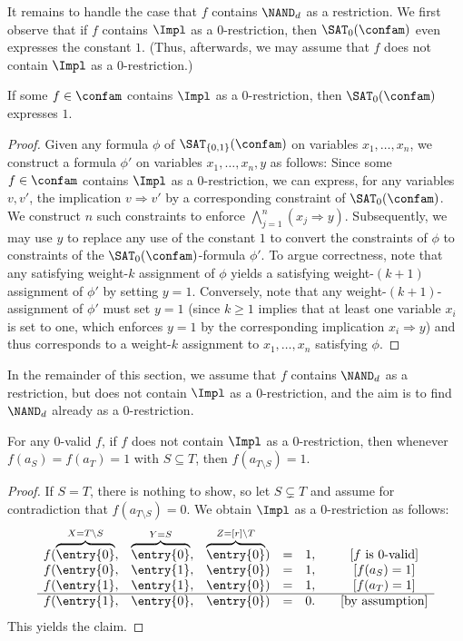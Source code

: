 %
%
It remains to handle the case that $f$ contains $\NAND_d$ as a restriction.
We first observe that if $f$ contains $\Impl$ as a $0$-restriction, then $\SAT_0(\confam)$ even expresses the constant $1$. (Thus, afterwards, we may assume that $f$ does not contain $\Impl$ as a 0-restriction.)
%
\begin{lem}\label{lem:0validexpresses1}
If some $f\in \confam$ contains $\Impl$ as a $0$-restriction, then $\SAT_0(\confam)$ expresses $1$. 
\end{lem}
\begin{proof}
Given any formula $\phi$ of $\SAT_{\{0,1\}}(\confam)$ on variables $x_1,\dots,x_n$, we construct a formula $\phi'$ on variables $x_1,\dots, x_n, y$ as follows: Since some $f\in \confam$ contains $\Impl$ as a $0$-restriction, we can express, for any variables $v,v'$, the implication $v \Rightarrow v'$ by a corresponding constraint of $\SAT_0(\confam)$. We construct $n$ such constraints to enforce $\bigwedge_{j=1}^{n} (x_j\Rightarrow  y)$. Subsequently, we may use $y$ to replace any use of the constant $1$ to convert the constraints of $\phi$ to constraints of the $\SAT_{0}(\confam)$-formula $\phi'$. 
%
To argue correctness, note that any satisfying weight-$k$ assignment of $\phi$ yields a satisfying weight-$(k+1)$ assignment of $\phi'$ by setting $y=1$. Conversely, note that any weight-$(k+1)$-assignment of $\phi'$ must set $y=1$ (since $k\ge 1$ implies that at least one variable $x_i$ is set to one, which enforces $y=1$ by the corresponding implication $x_i \Rightarrow y$) and thus corresponds to a weight-$k$ assignment to $x_1,\dots, x_n$ satisfying $\phi$. 
\end{proof}
%
%
%
%
%
In the remainder of this section, we assume that $f$ contains $\NAND_d$ as a restriction, but does not contain $\Impl$ as a $0$-restriction, and the aim is to find $\NAND_d$ already as a $0$-restriction.
%
%
\begin{lem}\label{lem:subsetdiff}
For any $0$-valid $f$, if $f$ does not contain $\Impl$ as a 0-restriction, then whenever $f(a_S) = f(a_T) = 1$ with $S\subseteq T$, then $f(a_{T\setminus S}) = 1$.
\end{lem}
\begin{proof}
If $S=T$, there is nothing to show, so let $S\subsetneq T$ and assume for contradiction that $f(a_{T\setminus S}) = 0$. We obtain $\Impl$ as a 0-restriction as follows:
\begin{align*}
\begin{matrix}
f( \overbrace{\entry{0}}^{X=T\setminus S},& \overbrace{\entry{0}}^{Y=S}, & \overbrace{\entry{0}}^{Z=[r]\setminus T}) & = & 1, & \quad \text{[$f$ is $0$-valid]}\\
f( \entry{0},& \entry{1}, & \entry{0}) & = & 1, & \quad\text{[$f(a_S)=1$]}\\
f( \entry{1},& \entry{1}, & \entry{0}) & = & 1, & \quad\text{[$f(a_T)=1$]}\\
  \hline
f( \entry{1},& \entry{0}, & \entry{0}) & = & 0. & \quad\text{[by assumption]}\\
\end{matrix}
\end{align*}
This yields the claim.
\end{proof}
